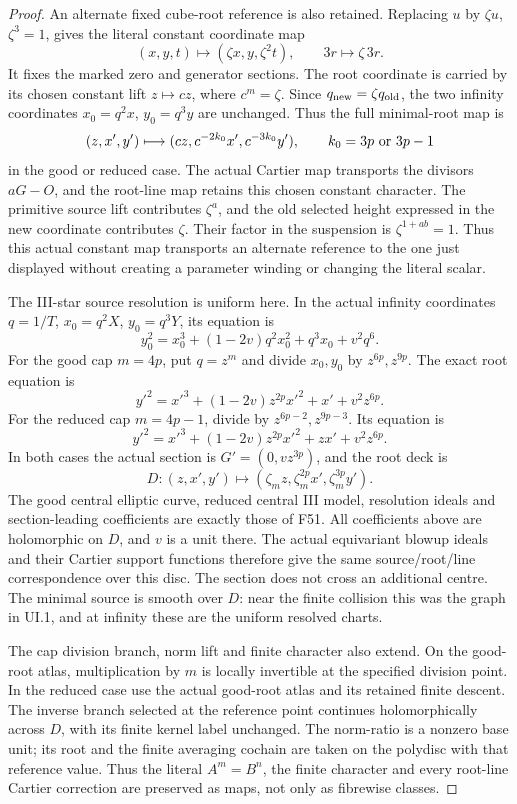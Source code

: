 \begin{proof}
An alternate fixed cube-root reference is also retained. Replacing
\(u\) by \(\zeta u\), \(\zeta^3=1\), gives the literal constant
coordinate map
\[
 (x,y,t)\longmapsto(\zeta x,y,\zeta^2t),\qquad
 3r\longmapsto\zeta\,3r.
\]
It fixes the marked zero and generator sections. The root coordinate
is carried by its chosen constant lift \(z\mapsto c z\), where
\(c^m=\zeta\). Since \(q_{\rm new}=\zeta q_{\rm old}\),
the two infinity coordinates \(x_0=q^2x\), \(y_0=q^3y\) are
unchanged. Thus the full minimal-root map is
\[
 (z,x',y')\longmapsto(cz,c^{-2k_0}x',c^{-3k_0}y'),
 \qquad k_0=3p\ \hbox{or}\ 3p-1
\]
in the good or reduced case. The actual Cartier map transports
the divisors \(aG-O\), and the root-line map retains this chosen
constant character.
The primitive source lift contributes \(\zeta^a\), and the old
selected height expressed in the new coordinate contributes
\(\zeta\). Their factor in the suspension is
\(\zeta^{1+ab}=1\). Thus this actual constant map transports an
alternate reference to the one just displayed without creating a
parameter winding or changing the literal scalar.

The III-star source resolution is uniform here. In the actual
infinity coordinates \(q=1/T\), \(x_0=q^2X\), \(y_0=q^3Y\), its
equation is
\[
 y_0^2=x_0^3+(1-2v)q^2x_0^2+q^3x_0+v^2q^6.
\]
For the good cap \(m=4p\), put \(q=z^m\) and divide \(x_0,y_0\)
by \(z^{6p},z^{9p}\). The exact root equation is
\[
 y'^2=x'^3+(1-2v)z^{2p}x'^2+x'+v^2z^{6p}.
\]
For the reduced cap \(m=4p-1\), divide by
\(z^{6p-2},z^{9p-3}\). Its equation is
\[
 y'^2=x'^3+(1-2v)z^{2p}x'^2+zx'+v^2z^{6p}.
\]
In both cases the actual section is \(G'=(0,vz^{3p})\), and
the root deck is
\[
 D:(z,x',y')\longmapsto
       (\zeta_m z,\zeta_m^{2p}x',\zeta_m^{3p}y').
\]
The good central elliptic curve, reduced central III model,
resolution ideals and section-leading coefficients are exactly
those of F51. All coefficients above are holomorphic on \(D\),
and \(v\) is a unit there. The actual equivariant blowup ideals
and their Cartier support functions therefore give the same
source/root/line correspondence over this disc. The section does
not cross an additional centre. The minimal source is smooth
over \(D\): near the finite collision this was the graph in
UI.1, and at infinity these are the uniform resolved charts.

The cap division branch, norm lift and finite character also
extend. On the good-root atlas, multiplication by \(m\) is
locally invertible at the specified division point. In the
reduced case use the actual good-root atlas and its retained
finite descent. The inverse branch selected at the reference
point continues holomorphically across \(D\), with its finite
kernel label unchanged. The norm-ratio is a nonzero base unit;
its root and the finite averaging cochain are taken on the
polydisc with that reference value. Thus the literal
\(A^m=B^n\), the finite character and every root-line Cartier
correction are preserved as maps, not only as fibrewise classes.


\end{proof}
